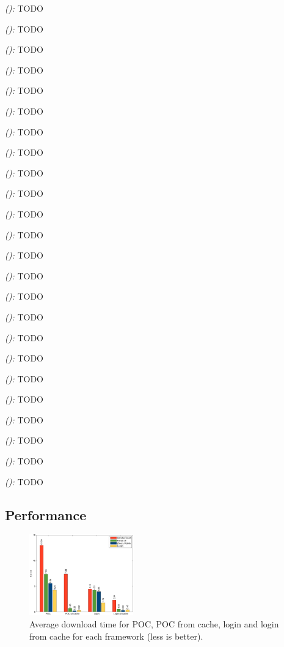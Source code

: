 \documentclass[a4paper]{artikel3}
\newcommand{\framework}[2]{ \emph{#1 (\textbf{#2}): }} %
\begin{document}
\framework{\sta{}}{}
TODO

\framework{\kendoa{}}{}
TODO

\framework{\jqma{}}{}
TODO

\framework{\lungoa{}}{}
TODO


\framework{\sta{}}{}
TODO

\framework{\kendoa{}}{}
TODO

\framework{\jqma{}}{}
TODO

\framework{\lungoa{}}{}
TODO


\framework{\sta{}}{}
TODO

\framework{\kendoa{}}{}
TODO

\framework{\jqma{}}{}
TODO

\framework{\lungoa{}}{}
TODO


\framework{\sta{}}{}
TODO

\framework{\kendoa{}}{}
TODO

\framework{\jqma{}}{}
TODO

\framework{\lungoa{}}{}
TODO


\framework{\sta{}}{}
TODO

\framework{\kendoa{}}{}
TODO

\framework{\jqma{}}{}
TODO

\framework{\lungoa{}}{}
TODO


\framework{\sta{}}{}
TODO

\framework{\kendoa{}}{}
TODO

\framework{\jqma{}}{}
TODO

\framework{\lungoa{}}{}
TODO
  

\subsection{Performance} %
\label{sec:evaluation-performance}

\begin{figure}
  \centering
  \includegraphics[width=0.4\textwidth]{../Masterproef/figuren/performance.pdf}
  \caption{Average download time for POC,  POC from cache,  login and login from cache for each framework (less is better).}
  \label{fig:performance}
\end{figure}
\end{document}
